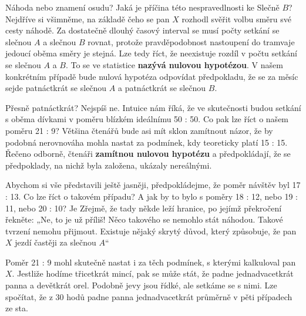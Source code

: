 \begin{mdframed}[style=mdexam]
\begin{example}
    {\centering
    \captionsetup{type=figure}
      {}                                                    \newline
      {}
    \par}

    Náhoda nebo znamení osudu? Jaká je příčina této nespravedlnosti ke Slečně \(B\)? Nejdříve si
    všimněme, na základě čeho se pan \(X\) rozhodl svěřit volbu směru své cesty náhodě. Za
    dostatečně dlouhý časový interval se musí počty setkání se slečnou \(A\) a slečnou \(B\) rovnat,
    protože pravděpodobnost nastoupení do tramvaje jedoucí oběma směry je stejná. Lze tedy říct, že
    neexistuje rozdíl v počtu setkání se slečnou \(A\) a \(B\). To se ve statistice \textbf{nazývá
    nulovou hypotézou}. V našem konkrétním případě bude nulová hypotéza odpovídat předpokladu, že se
    za měsíc sejde patnáctkrát se slečnou \(A\) a patnáctkrát se slečnou \(B\).

    Přesně patnáctkrát? Nejspíš ne. Intuice nám říká, že ve skutečnosti budou setkání s oběma
    dívkami v poměru blízkém ideálnímu 50 : 50. Co pak lze říct o našem poměru 21 : 9? Většina
    čtenářů bude asi mít sklon zamítnout názor, že by podobná nerovnováha mohla nastat za podmínek,
    kdy teoreticky platí 15 : 15. Řečeno odborně, čtenáři \textbf{zamítnou nulovou hypotézu} a
    předpokládají, že se předpoklady, na nichž byla založena, ukázaly nereálnými. 

    Abychom si vše představili ještě jasněji, předpokládejme, že poměr návštěv byl 17 : 13. Co lze
    říct o takovém případu? A jak by to bylo s poměry 18 : 12, nebo 19 : 11, nebo 20 : 10? Je
    Zřejmě, že tady někde leží hranice, po jejímž překročení řekněte: „Ne, to je už příliš! Něco
    takového se nemohlo stát náhodou. Takové tvrzení nemohu přijmout. Existuje nějaký skrytý důvod,
    který způsobuje, že pan \(X\) jezdí častěji za slečnou \(A\)“

    Poměr 21 : 9 mohl skutečně nastat i za těch podmínek, s kterými kalkuloval pan \(X\). Jestliže
    hodíme třicetkrát mincí, pak se může stát, že padne jednadvacetkrát panna a devětkrát orel.
    Podobně jevy jsou řídké, ale setkáme se s nimi. Lze spočítat, že z 30 hodů padne panna
    jednadvacetkrát průměrně v pěti případech ze sta. 


\end{example}
\end{mdframed}
